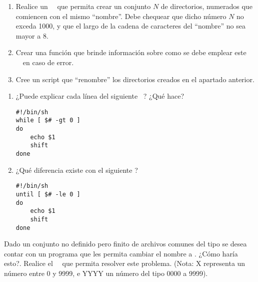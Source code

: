 \begin{ejercicio}
\begin{enumerate}

\item Realice un \shell~\script~que permita crear un conjunto $N$ de directorios, numerados que comiencen con el mismo ``nombre''. Debe chequear que dicho número $N$ no exceda 1000, y que el largo de la cadena de caracteres del ``nombre'' no sea mayor a 8. 
\item Crear una función  que brinde información sobre como se debe emplear este \shell~\script~en caso de error.

\item Cree un script que ``renombre'' los directorios creados en el apartado anterior.

\end{enumerate}
\end{ejercicio}

\begin{ejercicio}
\begin{enumerate}
\item ¿Puede explicar cada línea del siguiente \shell~\script? ¿Qué hace?
\begin{verbatim}
#!/bin/sh
while [ $# -gt 0 ] 
do
    echo $1
    shift 
done
\end{verbatim}

\item ¿Qué diferencia existe con el siguiente \script?
\begin{verbatim}
#!/bin/sh
until [ $# -le 0 ] 
do
    echo $1
    shift 
done
\end{verbatim}
\end{enumerate}
\end{ejercicio}

\begin{ejercicio}
Dado un conjunto no definido pero finito de archivos comunes del tipo  se desea contar con un programa que les permita cambiar el nombre a . ¿Cómo haría esto?. Realice el \shell~\script~que permita resolver este problema. (Nota: X representa un número entre 0 y 9999, e YYYY un número del tipo 0000 a 9999).
\end{ejercicio}
\vspace*{0.5cm}

